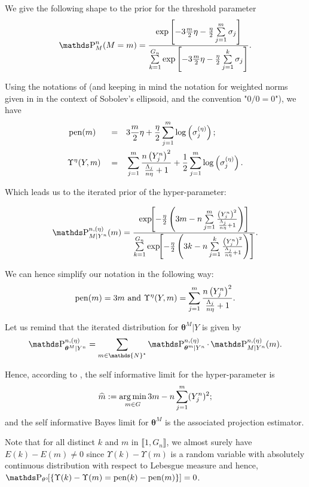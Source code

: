 We give the following shape to the prior for the threshold parameter
\[\P_{M}^{n}(M = m) = \frac{\exp\left[-3\frac{m}{2} \eta - \frac{\eta}{2} \sum\limits_{j = 1}^{m} \sigma_{j} \right]}{\sum\limits_{k = 1}^{G_{n}} \exp\left[-3 \frac{m}{2} \eta - \frac{\eta}{2} \sum\limits_{j = 1}^{k} \sigma_{j} \right]}.\]

Using the notations of  (and keeping in mind the notation for weighted norms given in  in the context of Sobolev's ellipsoid, and the convention "$0/0 = 0$"), we have 
\begin{alignat*}{3}
& \operatorname{pen}(m) && = && 3\frac{m}{2} \eta + \frac{\eta}{2} \sum\limits_{j = 1}^{m} \log\left(\sigma_{j}^{(\eta)}\right);\\
& \Upsilon^{\eta}(Y, m) && = && \sum\limits_{j = 1}^{m} \frac{n \left(Y^{n}_{j}\right)^{2}}{\frac{\Lambda_{j}}{n \eta} + 1} + \frac{1}{2} \sum\limits_{j = 1}^{m} \log\left(\sigma_{j}^{(\eta)}\right).
\end{alignat*}

Which leads us to the iterated prior of the hyper-parameter:

\[\P_{M \vert Y^{n}}^{n, (\eta)}(m) = \frac{\exp\!\!\left[- \frac{\eta}{2}\left( 3 m - n \sum\limits_{j = 1}^{m} \frac{\left(Y^{n}_{j}\right)^{2}}{\frac{\Lambda_{j}}{n \eta} + 1} \right) \right] }{\sum\limits_{k = 1}^{G_{n}} \exp\!\!\left[- \frac{\eta}{2}\left( 3 k - n \sum\limits_{j = 1}^{k} \frac{\left(Y^{n}_{j}\right)^{2}}{\frac{\Lambda_{j}}{n \eta} + 1} \right)\right]}.\]

We can hence simplify our notation in the following way:
\[\operatorname{pen}(m) = 3 m \text{ and } \Upsilon^{\eta}(Y, m) = \sum\limits_{j = 1}^{m} \frac{n \left(Y^{n}_{j}\right)^{2}}{\frac{\Lambda_{j}}{n \eta} + 1}.\]

Let us remind that the iterated distribution for $\boldsymbol{\theta}^{M}\vert Y$ is given by
\[\P_{\boldsymbol{\theta}^{M} \vert Y^{n}}^{n, (\eta)} = \sum\limits_{m \in \mathds{N}^{\star}}\P_{\boldsymbol{\theta}^{m} \vert Y^{n}}^{n, (\eta)} \cdot \P_{M \vert Y^{n}}^{n, (\eta)}(m).\]

Hence, according to , the self informative limit for the hyper-parameter is
\[\widehat{m} := \operatorname*{arg\,min}_{m \in G} 3 m - n \sum\limits_{j = 1}^{m}(Y_{j}^{n})^{2};\]
and the self informative Bayes limit for $\boldsymbol{\theta}^{M}$ is the associated projection estimator.

\medskip

Note that for all distinct $k$ and $m$ in $\llbracket 1, G_{n} \rrbracket$, we almost surely have $E(k) - E(m) \neq 0$ since $\Upsilon(k) - \Upsilon(m)$ is a random variable with absolutely continuous distribution with respect to Lebesgue measure and hence, $\P_{\theta^{\circ}}\!\!\left[\{\Upsilon(k) - \Upsilon(m) = \pen(k) - \pen(m)\}\right] = 0$.

